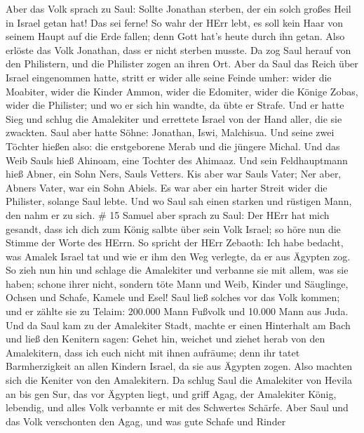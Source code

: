  Aber das Volk sprach zu Saul: Sollte Jonathan sterben, der
ein solch großes Heil in Israel getan hat! Das sei ferne! So wahr der
HErr lebt, es soll kein Haar von seinem Haupt auf die Erde fallen; denn
Gott hat's heute durch ihn getan. Also erlöste das Volk Jonathan, dass
er nicht sterben musste.  Da zog Saul herauf von den
Philistern, und die Philister zogen an ihren Ort.  Aber da
Saul das Reich über Israel eingenommen hatte, stritt er wider alle seine
Feinde umher: wider die Moabiter, wider die Kinder Ammon, wider die
Edomiter, wider die Könige Zobas, wider die Philister; und wo er sich
hin wandte, da übte er Strafe.  Und er hatte Sieg und
schlug die Amalekiter und errettete Israel von der Hand aller, die sie
zwackten.  Saul aber hatte Söhne: Jonathan, Iswi,
Malchisua. Und seine zwei Töchter hießen also: die erstgeborene Merab
und die jüngere Michal.  Und das Weib Sauls hieß Ahinoam,
eine Tochter des Ahimaaz. Und sein Feldhauptmann hieß Abner, ein Sohn
Ners, Sauls Vetters.  Kis aber war Sauls Vater; Ner aber,
Abners Vater, war ein Sohn Abiels.  Es war aber ein harter
Streit wider die Philister, solange Saul lebte. Und wo Saul sah einen
starken und rüstigen Mann, den nahm er zu sich. \# 15 
Samuel aber sprach zu Saul: Der HErr hat mich gesandt, dass ich dich zum
König salbte über sein Volk Israel; so höre nun die Stimme der Worte des
HErrn.  So spricht der HErr Zebaoth: Ich habe bedacht, was
Amalek Israel tat und wie er ihm den Weg verlegte, da er aus Ägypten
zog.  So zieh nun hin und schlage die Amalekiter und
verbanne sie mit allem, was sie haben; schone ihrer nicht, sondern töte
Mann und Weib, Kinder und Säuglinge, Ochsen und Schafe, Kamele und Esel!
 Saul ließ solches vor das Volk kommen; und er zählte sie zu
Telaim: 200.000 Mann Fußvolk und 10.000 Mann aus Juda.  Und
da Saul kam zu der Amalekiter Stadt, machte er einen Hinterhalt am Bach
 und ließ den Kenitern sagen: Gehet hin, weichet und ziehet
herab von den Amalekitern, dass ich euch nicht mit ihnen aufräume; denn
ihr tatet Barmherzigkeit an allen Kindern Israel, da sie aus Ägypten
zogen. Also machten sich die Keniter von den Amalekitern. 
Da schlug Saul die Amalekiter von Hevila an bis gen Sur, das vor Ägypten
liegt,  und griff Agag, der Amalekiter König, lebendig, und
alles Volk verbannte er mit des Schwertes Schärfe.  Aber
Saul und das Volk verschonten den Agag, und was gute Schafe und Rinder
